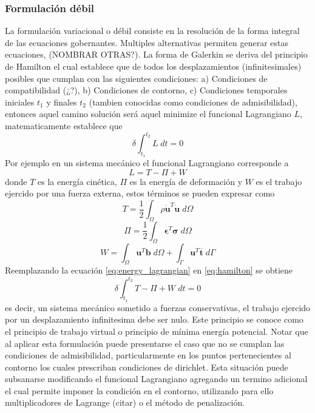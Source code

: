 \subsubsection{Formulación débil}
La formulación variacional o débil consiste en la resolución de la forma integral de las ecuaciones gobernantes. Multiples alternativas permiten generar estas ecuaciones, (NOMBRAR OTRAS?). La forma de Galerkin se deriva del principio de Hamilton el cual establece que de todos los desplazamientos (infinitesimales) posibles que cumplan con las siguientes condiciones: a) Condiciones de compatibilidad (¿?), b) Condiciones de contorno, c) Condiciones temporales iniciales $t_1$ y finales $t_2$ (tambien conocidas como condiciones de admisibilidad), entonces aquel camino solución será aquel minimize el funcional Lagrangiano $L$, matematicamente establece que
\begin{equation} \label{eq:hamilton}
    \delta \int_{t_1}^{t_2} L \; dt = 0
\end{equation}
Por ejemplo en un sistema mecánico el funcional Lagrangiano corresponde a 
\begin{equation} \label{eq:energy_lagrangian}
    L = T - \Pi + W
\end{equation}
donde $T$ es la energía cinética, $\Pi$ es la energía de deformación y $W$ es el trabajo ejercido por una fuerza externa, estos términos se pueden expresar como
\begin{equation}
    T = \frac{1}{2} \int_{\Omega} \rho \dot{\bm{u}}^T \dot{\bm{u}} \; d\Omega
\end{equation}
\begin{equation}
    \Pi = \frac{1}{2} \int_{\Omega} \bm{\epsilon}^T \bm{\sigma} \; d\Omega
\end{equation}
\begin{equation}
    W = \int_{\Omega} \bm{u}^T\bm{b} \; d\Omega + \int_{\Gamma} \bm{u}^T \overline{\bm{t}} \; d\Gamma
\end{equation}
Reemplazando la ecuación \ref{eq:energy_lagrangian} en \ref{eq:hamilton} se obtiene
\begin{equation}
    \delta \int_{t_1}^{t_2} T - \Pi + W \; dt = 0
\end{equation}
es decir, un sistema mecánico sometido a fuerzas conservativas, el trabajo ejercido por un desplazamiento infinitesima debe ser nulo. Este principio se conoce como el principio de trabajo virtual o principio de mínima energía potencial. Notar que al aplicar esta formulación puede presentarse el caso que no se cumplan las condiciones de admisibilidad, particularmente en los puntos pertenecientes al contorno los cuales prescriban condiciones de dirichlet. Esta situación puede subsanarse modificando el funcional Lagrangiano agregando un termino adicional el cual permite imponer la condición en el contorno, utilizando para ello multiplicadores de Lagrange (citar) o el método de penalización. 

